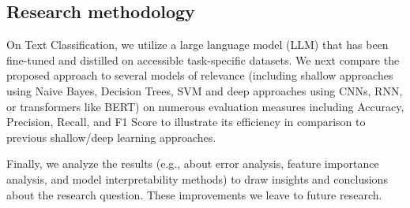 \subsection{Research methodology}
On Text Classification, we utilize a large language model (LLM) that has been fine-tuned and distilled on accessible task-specific datasets. We next compare the proposed approach to several models of relevance (including shallow approaches using Naive Bayes, Decision Trees, SVM and deep approaches using CNNs, RNN, or transformers like BERT) on numerous evaluation measures including Accuracy, Precision, Recall, and F1 Score to illustrate its efficiency in comparison to previous shallow/deep learning approaches.

Finally, we analyze the results (e.g., about error analysis, feature importance analysis, and model interpretability methods) to draw insights and conclusions about the research question. These improvements we leave to future research.